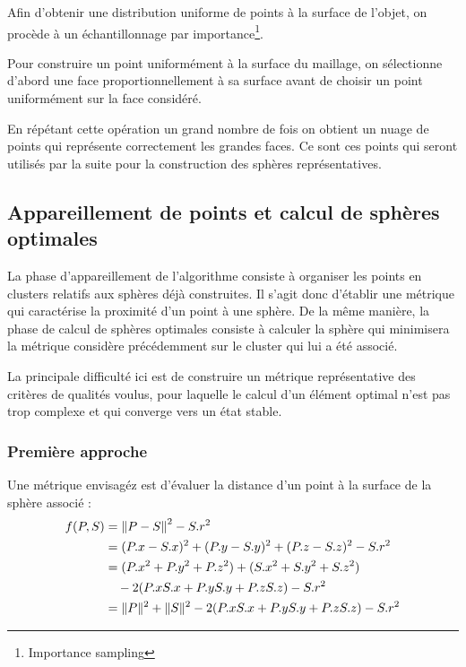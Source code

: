 \documentclass[10pt,a4paper,twoside, twocolumn]{report}
\begin{document}
Afin d'obtenir une distribution uniforme de points à la surface de l'objet, on procède à un échantillonnage par importance\footnote{Importance sampling}.

Pour construire un point uniformément à la surface du maillage, on sélectionne d'abord une face proportionnellement à sa surface avant de choisir un point uniformément sur la face considéré.

En répétant cette opération un grand nombre de fois on obtient un nuage de points qui représente correctement les grandes faces. Ce sont ces points qui seront utilisés par la suite pour la construction des sphères représentatives.

\subsection{Appareillement de points et calcul de sphères optimales}

La phase d'appareillement de l'algorithme consiste à organiser les points en clusters relatifs aux sphères déjà construites. Il s’agit donc d’établir une métrique qui caractérise la proximité d'un point à une sphère. De la même manière, la phase de calcul de sphères optimales consiste à calculer la sphère qui minimisera la métrique considère précédemment sur le cluster qui lui a été associé.

La principale difficulté ici est de construire un métrique représentative des critères de qualités voulus, pour laquelle le calcul d'un élément optimal n'est pas trop complexe et qui converge vers un état stable.

\subsubsection{Première approche}

Une métrique envisagéz est d'évaluer la distance d'un point à la surface de la sphère associé :
\begin{align}
	f(P, S) &= \left\|P-S\right\|^2 - S.r^2															\label{eq:metrique}	\\
					&= (P.x-S.x)^2 + (P.y-S.y)^2 + (P.z-S.z)^2 - S.r^2					\notag \\
					&= (P.x^2 + P.y^2+P.z^2) + (S.x^2+S.y^2+S.z^2)							\notag \\
					&\quad - 2(P.xS.x + P.yS.y + P.zS.z)  - S.r^2								\notag \\
					&= \|P\|^2 + \|S\|^2 - 2(P.xS.x + P.yS.y + P.zS.z) - S.r^2	\notag
\end{align}
\end{document}
